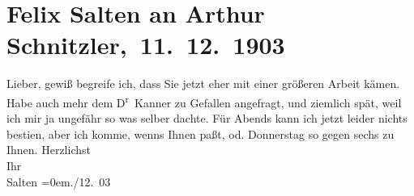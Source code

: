 

         
         \renewcommand{\erwaehntePersonen}{Personen: Heinrich Kanner, Felix Salten}
         \renewcommand{\erwaehnteOrte}{Orte: Wien}
         \renewcommand{\erwaehnteWerke}{}
               \section[ Felix Salten an Arthur Schnitzler, 11. 12. 1903]{ Felix Salten an Arthur Schnitzler, 11. 12. 1903}\nopagebreak{}\rehead{ }\begin{ledgroupsized}[t]{13cm}\normalsize\beginnumbering{} \toendnotes[C]{\smallbreak\pagebreak[2]} 
\toendnotes[C]{\smallbreak}\pstart
           \noindent{}{\pb}Lieber, gewiß begreife ich, dass Sie jetzt eher mit einer größeren
               Arbeit kämen. Habe auch mehr dem D\textsuperscript{r} Kanner zu Gefallen angefragt, und ziemlich spät, weil ich mir
               ja ungefähr so was selber dachte. Für Abends kann ich jetzt leider
               nichts besti{\geminationm}en, aber ich komme, wenns Ihnen paßt,
                  \label{K_L03356-1v}\label{K_L03356-1h} od. Donnerstag so gegen sechs zu Ihnen.\pend
           \pstart
           Herzlichst {\\[\baselineskip]}Ihr {\\[\baselineskip]}\spacefill\mbox{Salten}\pend
           \leftskip=0em{}./12. 03\pend
           
         
         \endnumbering{}\end{ledgroupsized}  \newcommand{\dateiname}{L03356}\newcommand{\titel}{Felix Salten an Arthur Schnitzler, 11. 12. 1903}\newcommand{\editorInnen}{Martin Anton Müller und Laura Untner}
      